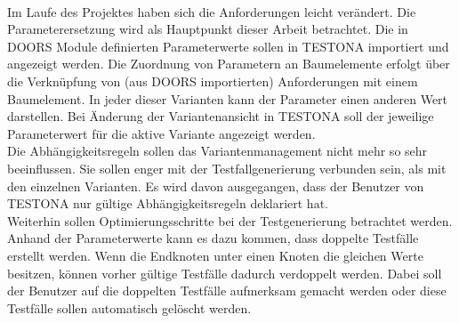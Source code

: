 \paragraph{}

Im Laufe des Projektes haben sich die Anforderungen leicht verändert. Die Parameterersetzung wird als Hauptpunkt dieser Arbeit betrachtet. Die in DOORS Module definierten Parameterwerte sollen in TESTONA importiert und angezeigt werden. Die Zuordnung von Parametern an Baumelemente erfolgt über die Verknüpfung von (aus DOORS importierten) Anforderungen mit einem Baumelement. In jeder dieser Varianten kann der Parameter einen anderen Wert darstellen. Bei Änderung der Variantenansicht in TESTONA soll der jeweilige Parameterwert für die aktive Variante angezeigt werden.\\


Die Abhängigkeitsregeln sollen das Variantenmanagement nicht mehr so sehr beeinflussen. Sie  sollen  enger mit der Testfallgenerierung verbunden sein, als mit den einzelnen Varianten. Es wird davon ausgegangen, dass der Benutzer von TESTONA nur gültige Abhängigkeitsregeln deklariert hat.\\


Weiterhin sollen Optimierungsschritte bei der Testgenerierung betrachtet werden. Anhand der Parameterwerte kann es dazu kommen, dass doppelte Testfälle erstellt werden. Wenn die Endknoten unter einen Knoten die gleichen Werte besitzen, können vorher gültige Testfälle dadurch verdoppelt werden. Dabei soll der Benutzer auf die doppelten Testfälle aufmerksam gemacht werden oder diese Testfälle sollen automatisch gelöscht werden.